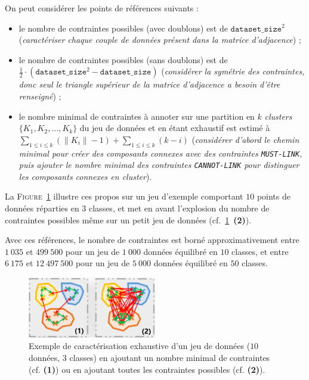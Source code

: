 			\begin{leftBarAuthorOpinion}
				On peut considérer les points de références suivants :
				\begin{itemize}
					\item le nombre de contraintes possibles (avec doublons) est de $\texttt{dataset\_size}^{2}$ (\textit{caractériser chaque couple de données présent dans la matrice d'adjacence}) ;
					\item le nombre de contraintes possibles (sans doublons) est de $\frac{1}{2} \cdot (\texttt{dataset\_size}^{2} - \texttt{dataset\_size})$ (\textit{considérer la symétrie des contraintes, donc seul le triangle supérieur de la matrice d'adjacence a besoin d'être renseigné}) ;
					\item le nombre minimal de contraintes à annoter sur une partition en $k$ \textit{clusters} $\{K_{1}, K_{2}, ..., K_{k}\} $ du jeu de données et en étant exhaustif est estimé à ${\displaystyle \sum\limits_{1 \leq i \leq k}{(\|K_{i}\|-1)} + \sum\limits_{1 \leq i \leq k}{(k-i)}} $ (\textit{considérer d'abord le chemin minimal pour créer des composants connexes avec des contraintes \texttt{MUST-LINK}, puis ajouter le nombre minimal des contraintes \texttt{CANNOT-LINK} pour distinguer les composants connexes en \textit{cluster}}).
				\end{itemize}
				La \textsc{Figure~\ref{figure:4.3.3-ETUDE-COUT-NOMBRE-CONTRAINTES-EXEMPLES}} illustre ces propos sur un jeu d'exemple comportant $10$ points de données réparties en $3$ classes, et met en avant l'explosion du nombre de contraintes possibles même sur un petit jeu de données (cf.~\ref{figure:4.3.3-ETUDE-COUT-NOMBRE-CONTRAINTES-EXEMPLES}~\textbf{(2)}).
				
				Avec ces références, le nombre de contraintes est borné approximativement
				entre $1~035$ et $499~500$ pour un jeu de $1~000$ données équilibré en $10$ classes,
				et entre $6~175$ et $12~497~500$ pour un jeu de $5~000$ données équilibré en $50$ classes.
				\begin{figure}[H]
					\centering
					\includegraphics[width=0.5\textwidth]{figures/etude-nombre-contraintes-2-bornes-limites}
					\caption{
						Exemple de caractérisation exhaustive d'un jeu de données ($10$ données, $3$ classes) en ajoutant un nombre minimal de contraintes (cf. \textbf{(1)}) ou en ajoutant toutes les contraintes possibles (cf. \textbf{(2)}).
					}
					\label{figure:4.3.3-ETUDE-COUT-NOMBRE-CONTRAINTES-EXEMPLES}
				\end{figure}
			\end{leftBarAuthorOpinion}

